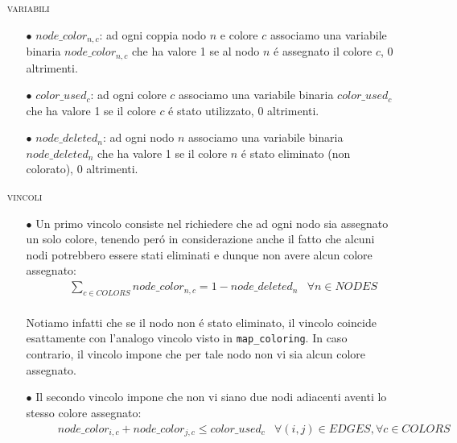 \documentclass{article}
\begin{document}
\begin{itemize}
\item[] \textsc{variabili}
	\begin{itemize}
	\item[$\bullet$] $node\_color_{n,c}$: ad ogni coppia nodo $n$ e colore $c$ associamo una variabile binaria $node\_color_{n,c}$ che ha valore 1 se al nodo $n$ \'e assegnato il colore $c$, 0 altrimenti.\\
	\item[$\bullet$] $color\_used_{c}$: ad ogni colore $c$ associamo una variabile binaria $color\_used_{c}$ che ha valore 1 se il colore $c$ \'e stato utilizzato, 0 altrimenti.\\
	\item[$\bullet$] $node\_deleted_{n}$: ad ogni nodo $n$ associamo una variabile binaria $node\_deleted_{n}$ che ha valore 1 se il colore $n$ \'e stato eliminato (non colorato), 0 altrimenti.\\
	\end{itemize}
	
\item[] \textsc{vincoli}
	\begin{itemize}
	\item[$\bullet$] Un primo vincolo consiste nel richiedere che ad ogni nodo sia assegnato un solo colore, tenendo per\'o in considerazione anche il fatto che alcuni nodi potrebbero essere stati eliminati e dunque non avere alcun colore assegnato:\\
	\begin{equation*}
	\begin{aligned}
	& & &  \sum\limits_{c \in COLORS} node\_color_{n,c} = 1 - node\_deleted_{n} & \forall n \in NODES\\ 
	\end{aligned}
	\end{equation*}
	
	Notiamo infatti che se il nodo non \'e stato eliminato, il vincolo coincide esattamente con l'analogo vincolo visto in \texttt{map\_coloring}. In caso contrario, il vincolo impone che per tale nodo non vi sia alcun colore assegnato.\\
	
	\item[$\bullet$] Il secondo vincolo impone che non vi siano due nodi adiacenti aventi lo stesso colore assegnato:\\
	\begin{equation*}
	\begin{aligned}
	& & &  node\_color_{i,c} + node\_color_{j,c} \le color\_used_{c} & \forall (i,j) \in EDGES, \forall c \in COLORS\\
	

\end{aligned}
\end{equation*}
\end{itemize}
\end{itemize}
\end{document}
